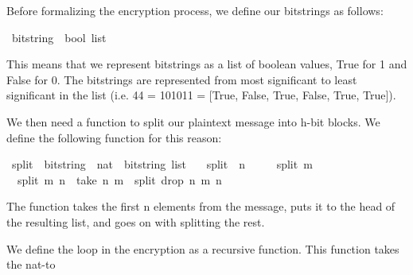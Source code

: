 \begin{isabellebody}
%
\isatagdocument
%
\isamarkuptrue%
%
\endisatagdocument
{\isafolddocument}%
%
\isadelimdocument
%
\endisadelimdocument
%
\begin{isamarkuptext}%
Before formalizing the encryption process, we define our bitstrings as follows:%
\end{isamarkuptext}\isamarkuptrue%
\isamarkupfalse%
\ bitstring\ {\isacharequal}{\kern0pt}\ {\isachardoublequoteopen}bool\ list{\isachardoublequoteclose}%
\begin{isamarkuptext}%
This means that we represent bitstrings as a list of boolean values, True for 1 and False for
0. The bitstrings are represented from most significant to least significant in the list (i.e.
44 = 101011 = [True, False, True, False, True, True]).%
\end{isamarkuptext}\isamarkuptrue%
%
\begin{isamarkuptext}%
We then need a function to split our plaintext message into h-bit blocks. We define the 
following function for this reason:%
\end{isamarkuptext}\isamarkuptrue%
\isamarkupfalse%
\ split\ {\isacharcolon}{\kern0pt}{\isacharcolon}{\kern0pt}\ {\isachardoublequoteopen}bitstring\ {\isasymRightarrow}\ nat\ {\isasymRightarrow}\ bitstring\ list{\isachardoublequoteclose}\ \isanewline
\ \ {\isachardoublequoteopen}split\ {\isacharbrackleft}{\kern0pt}{\isacharbrackright}{\kern0pt}\ n\ {\isacharequal}{\kern0pt}\ {\isacharbrackleft}{\kern0pt}{\isacharbrackright}{\kern0pt}{\isachardoublequoteclose}\ {\isacharbar}{\kern0pt}\isanewline
\ \ {\isachardoublequoteopen}split\ m\ {}\ {\isacharequal}{\kern0pt}\ {\isacharbrackleft}{\kern0pt}{\isacharbrackright}{\kern0pt}{\isachardoublequoteclose}\ {\isacharbar}{\kern0pt}\isanewline
\ \ {\isachardoublequoteopen}split\ m\ n\ {\isacharequal}{\kern0pt}\ {\isacharparenleft}{\kern0pt}take\ n\ m{\isacharparenright}{\kern0pt}\ {\isacharhash}{\kern0pt}\ {\isacharparenleft}{\kern0pt}split\ {\isacharparenleft}{\kern0pt}drop\ n\ m{\isacharparenright}{\kern0pt}\ n{\isacharparenright}{\kern0pt}{\isachardoublequoteclose}%
\begin{isamarkuptext}%
The function takes the first n elements from the message, puts it to the head of the resulting 
list, and goes on with splitting the rest.%
\end{isamarkuptext}\isamarkuptrue%
%
\begin{isamarkuptext}%
We define the loop in the encryption as a recursive function. This function takes the nat-to

\end{isamarkuptext}
\end{isabellebody}
